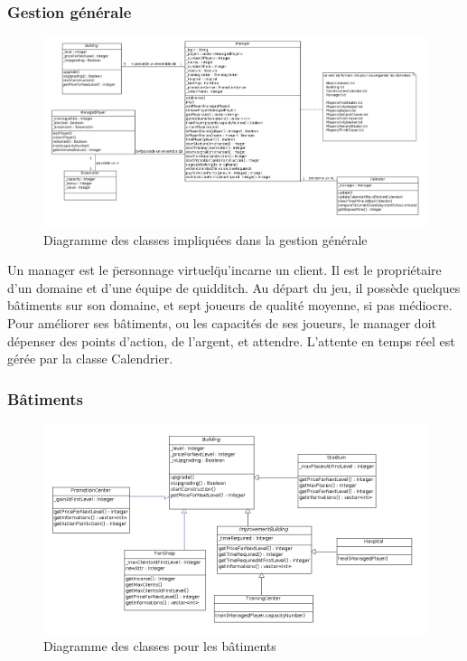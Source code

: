 \documentclass[a4paper,titlepage]{scrreprt}
\begin{document}
      \subsubsection{Gestion générale}
          \begin{figure}[H]
          \center
          \includegraphics[scale=0.35]{uml/class/Management.png}
         \caption{Diagramme des classes impliquées dans la gestion générale}
         \end{figure}

        Un manager est le \"personnage virtuel\" qu'incarne un client. Il est le propriétaire d'un domaine et d'une équipe de quidditch. Au départ du jeu, il possède quelques bâtiments sur son domaine, et sept joueurs de qualité moyenne, si pas médiocre. Pour améliorer ses bâtiments, ou les capacités de ses joueurs, le manager doit dépenser des points d'action, de l'argent, et attendre. L'attente en temps réel est gérée par la classe Calendrier.


      \subsubsection{Bâtiments}
          \begin{figure}[H]
          \center
          \includegraphics[scale=0.4]{uml/class/Buildings.png}
         \caption{Diagramme des classes pour les bâtiments}
         \end{figure}
\end{document}
